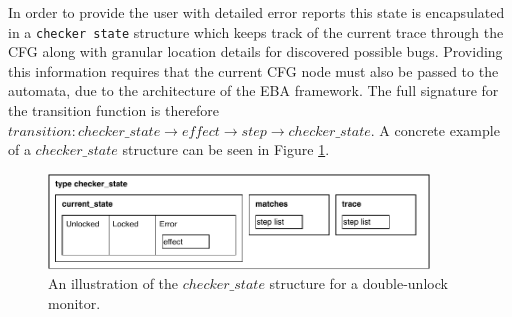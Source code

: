 \newpar In order to provide the user with detailed error reports this state is encapsulated in a \texttt{checker state} structure which keeps track of the current trace through the CFG along with granular location details for discovered possible bugs. Providing this information requires that the current CFG node must also be passed to the automata, due to the architecture of the EBA framework. The full signature for the transition function is therefore $transition: \mathit{checker\_state} \rightarrow \mathit{effect} \rightarrow \mathit{step} \rightarrow \mathit{checker\_state}$. A concrete example of a $checker\_state$ structure can be seen in Figure \ref{checker-state}.

\begin{figure}[H]
    \centering
    \includegraphics[width=0.9\textwidth]{implementation/figures/checker-state}
    \caption{An illustration of the $checker\_state$ structure for a double-unlock monitor.}
    \label{checker-state}
\end{figure}